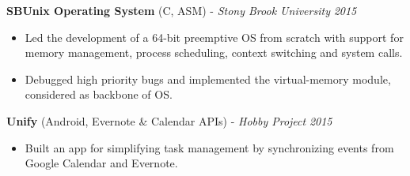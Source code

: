\documentclass[12pt]{article}
\newcommand{\sectionHeading}[1]{
\vspace{-15pt}
\section*{\small{#1}}
\vspace{-10pt}
\hrule
\vspace{8pt}
}
\newcommand {\projectSectionSubheading}[4]{
    \noindent \small{\textbf{#1} \textit{(#2)} : #3  \hfill \textit{#4}} \\
    \vspace{-10pt}
}
\newcommand {\projectSectionSubheadingAlternate}[4]{
    \noindent \small{\textbf{#1} (#3) - \textit{#2} \hfill \textit{#4}} \\
    \vspace{-22pt}
}
\newcommand {\projectSectionSubheadingAlternateNew}[2]{
    \noindent \small{\textbf{#1} \hfill \textit{#2}} \\
    \vspace{-22pt}
}
\newcommand{\sectionListStart}{
    \begin{itemize}[label={\small{\textbullet}}, leftmargin=20pt] %
}
\newcommand{\sectionListEnd}{\end{itemize} \vspace{-5pt}}
\newcommand{\sectionListItem}[1]{\item \small{#1}}
\begin{document}
\projectSectionSubheadingAlternate{SBUnix Operating System}{Stony Brook University}{C, ASM}{2015}
\sectionListStart
    \sectionListItem
        Led the development of a 64-bit preemptive OS from scratch with support for memory management, process scheduling, context switching and system calls. 
    \sectionListItem
        Debugged high priority bugs and implemented the virtual-memory module, considered as backbone of OS.
\sectionListEnd
    
\projectSectionSubheadingAlternate{Unify}{Hobby Project}{Android, Evernote \& Calendar APIs}{2015}
\sectionListStart
    \sectionListItem
        Built an app for simplifying task management by synchronizing events from Google Calendar and Evernote. 
        
\sectionListEnd









\end{document}
